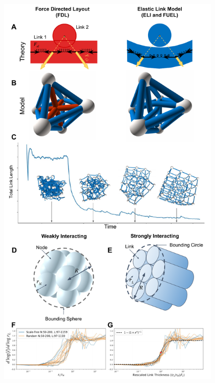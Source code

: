 \documentclass[endfloats,nofootinbib,preprint,floatfix,titlepage,superscriptaddress,linenumbers]{revtex4-1} %
\begin{document}
\linespread{1.5}
\begin{figure}
    \centering
    \includegraphics[width=.78\columnwidth, trim=0 12.5cm 0 0cm,clip]{fig-09-19/3d-crs-lat-trans-041018.pdf}

\end{figure}
\end{document}

